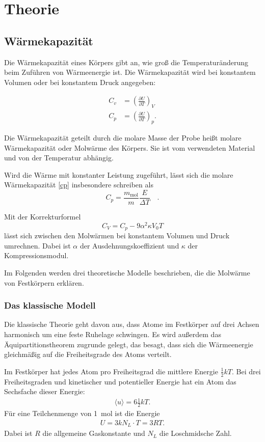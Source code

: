\section{Theorie}

\subsection{Wärmekapazität}
Die Wärmekapazität eines Körpers gibt an, wie groß die Temperaturänderung beim Zuführen von Wärmeenergie ist.
Die Wärmekapazität wird bei konstantem Volumen oder bei konstantem Druck angegeben:

\begin{align}
	C_v &= \left( \frac{\partial U}{\partial T} \right)_V \\
	\label{cp}
	C_p &= \left( \frac{\partial U}{\partial T} \right)_p.
\end{align}

Die Wärmekapazität geteilt durch die molare Masse der Probe heißt molare Wärmekapazität oder Molwärme des Körpers.
Sie ist vom verwendeten Material und von der Temperatur abhängig.

Wird die Wärme mit konstanter Leistung zugeführt, lässt sich die molare Wärmekapazität \eqref{cp} insbesondere schreiben als
\begin{equation}
\label{cp_mol}
	C_p=\frac{m_\text{mol}}{m}\frac{E}{\Delta T}\quad.
\end{equation}

Mit der Korrekturformel
\begin{equation}
	\label{kf}
	C_V=C_p-9\alpha^2\kappa V_0T
\end{equation}
lässt sich zwischen den Molwärmen bei konstantem Volumen und Druck umrechnen.
Dabei ist  $\alpha$ der Ausdehnungskoeffizient und $\kappa$ der Kompressionsmodul.

Im Folgenden werden drei theoretische Modelle beschrieben, die die Molwärme von Festkörpern erklären.

\subsubsection{Das klassische Modell}
Die klassische Theorie geht davon aus, dass Atome im Festkörper auf drei Achsen harmonisch um eine feste Ruhelage schwingen.
Es wird außerdem das Äquipartitionstheorem zugrunde gelegt, das besagt, dass sich die Wärmeenergie gleichmäßig auf die Freiheitsgrade des Atoms verteilt.

Im Festkörper hat jedes Atom pro Freiheitsgrad die mittlere Energie $\frac{1}{2}kT$.
Bei drei Freiheitsgraden und kinetischer und potentieller Energie hat ein Atom das Sechsfache dieser Energie:
\begin{align}
	\langle u \rangle = 6\frac{1}{2}kT.
\end{align}
Für eine Teilchenmenge von \SI{1}{\mol} ist die Energie
\begin{align}
	U = 3kN_L \cdot T = 3RT.
\end{align}
Dabei ist $R$ die allgemeine Gaskonstante und $N_L$ die Loschmidsche Zahl.


